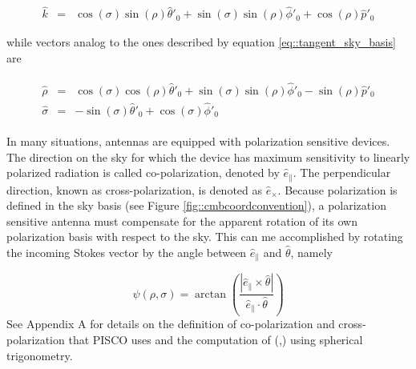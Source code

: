 \documentclass[a4paper,fleqn]{cas-dc}\sloppy
\newcommand{\co}{\mathbin{\|}}
\newcommand{\cx}{\mathbin{\times}}
\begin{document}
	\begin{equation}
	\begin{aligned}
	\hat{k}       &=&  \cos(\sigma)\sin(\rho)\hat{\theta}'_0 + \sin(\sigma)\sin(\rho) \hat{\phi}'_0 + \cos(\rho) \hat{p}'_0 
	\end{aligned}
	\end{equation}
	
	\noindent
	while vectors analog to the ones described by equation \ref{eq::tangent_sky_basis} are
	
	\begin{eqnarray}
	\begin{aligned}
	\hat{\rho}    &=&  \cos(\sigma)\cos(\rho)\hat{\theta}'_0 + \sin(\sigma)\sin(\rho) \hat{\phi}'_0 - \sin(\rho) \hat{p}'_0 \\
	\hat{\sigma}  &=& -\sin(\sigma)\hat{\theta}'_0 + \cos(\sigma)\hat{\phi}'_0
	\end{aligned}
	\end{eqnarray}
	
	In many situations, antennas are equipped with polarization sensitive devices. The direction on the sky for which the device has maximum sensitivity to linearly polarized radiation is called co-polarization, denoted by $\hat{e}_{\co}$. The perpendicular direction, known as cross-polarization, is denoted as $\hat{e}_{\cx}$.
	Because polarization is defined in the sky basis (see Figure \ref{fig::cmbcoordconvention}), a polarization sensitive antenna must compensate for the apparent rotation of its own polarization basis with respect to the sky. This can me accomplished by rotating the incoming Stokes vector by the angle between $\hat{e}_{\co}$ and $\hat{\theta}$, namely
	
	\begin{equation}
	\psi(\rho,\sigma) = \arctan \left( \frac{ |\hat{e}_{\co} \times \hat{\theta}| }{ \hat{e}_{\co} \cdot \hat{\theta} } \right)
	\label{eq::psi}
	\end{equation}
	See Appendix A for details on the definition of co-polarization and cross-polarization that PISCO uses and the computation of \psi(\rho,\sigma) using spherical trigonometry.
	
\end{document}
